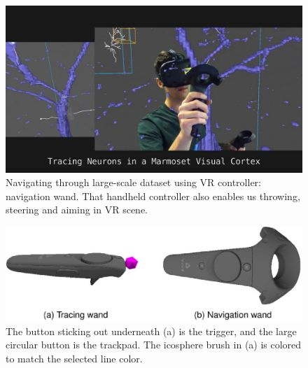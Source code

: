 \documentclass[10pt,twocolumn,letterpaper]{article}
\begin{document}
\begin{figure}[h]
\begin{center}
   \includegraphics[width=1.0\linewidth]{neurou-tracing.png}
\end{center}
   \caption{Navigating through large-scale dataset using VR controller: navigation wand. That handheld controller also enables us throwing, steering and aiming in VR scene.}
\label{fig:long}
\label{fig:onecol}
\end{figure}

\begin{figure}[h]
\begin{center}
   \includegraphics[width=1.0\linewidth]{wands.png}
\end{center}
   \caption{The button sticking out underneath (a) is
the trigger, and the large circular button is the trackpad. The icosphere
brush in (a) is colored to match the selected line color.}
\label{fig:long}
\label{fig:onecol}
\end{figure}
\end{document}
